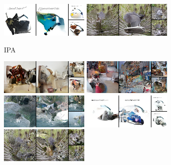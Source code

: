 \begin{figure}[t]
\begin{subfigure}[t]{0.2\textwidth}
      \includegraphics[height=\imagenetimgheight]{figs/cigcvae/image-samples/imagenet64/freeform_aipo_3_samples.png}
      \includegraphics[height=\imagenetimgheight]{figs/cigcvae/image-samples/imagenet64/freeform_aipo_4_samples.png}
      \caption{IPA}
    \end{subfigure}
    \begin{subfigure}[t]{0.2\textwidth}
      \centering
      \includegraphics[height=\imagenetimgheight]{figs/cigcvae/image-samples/imagenet64/freeform_aipo_0_scratch_samples.png}
      \includegraphics[height=\imagenetimgheight]{figs/cigcvae/image-samples/imagenet64/freeform_aipo_1_scratch_samples.png}
      \includegraphics[height=\imagenetimgheight]{figs/cigcvae/image-samples/imagenet64/freeform_aipo_2_scratch_samples.png}
      \includegraphics[height=\imagenetimgheight]{figs/cigcvae/image-samples/imagenet64/freeform_aipo_3_scratch_samples.png}
      \includegraphics[height=\imagenetimgheight]{figs/cigcvae/image-samples/imagenet64/freeform_aipo_4_scratch_samples.png}

\end{subfigure}
\end{figure}
